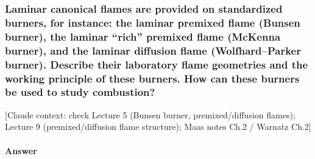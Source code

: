 \subsubsection{Laminar canonical flames are provided on standardized burners, for instance: the laminar premixed flame (Bunsen burner), the laminar ``rich'' premixed flame (McKenna burner), and the laminar diffusion flame (Wolfhard--Parker burner). Describe their laboratory flame geometries and the working principle of these burners. How can these burners be used to study combustion?}

{\color{gray}\footnotesize [Claude context: check Lecture 5 (Bunsen burner, premixed/diffusion flames); Lecture 9 (premixed/diffusion flame structure); Maas notes Ch.2 / Warnatz Ch.2]}

\paragraph{Answer} 

